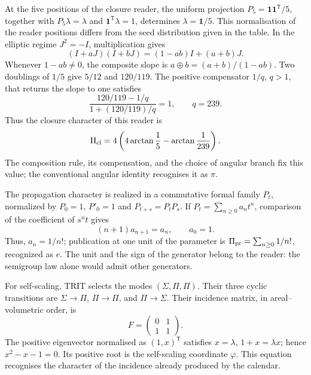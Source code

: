 At the five positions of the closure reader, the uniform projection
\(P_5=\mathbf1\mathbf1^{\mathsf T}/5\), together with
\(P_5\lambda=\lambda\) and \(\mathbf1^{\mathsf T}\lambda=1\), determines
\(\lambda=\mathbf1/5\). This normalisation of the reader positions
differs from the seed distribution given in the table.
In the elliptic regime \(J^2=-I\), multiplication gives
\[
(I+aJ)(I+bJ)=(1-ab)I+(a+b)J.
\]
Whenever \(1-ab\ne0\), the composite slope is
\(a\oplus b=(a+b)/(1-ab)\). Two doublings of \(1/5\) give
\(5/12\) and \(120/119\). The positive compensator \(1/q\), \(q>1\),
that returns the slope to one satisfies
\[
\frac{120/119-1/q}{1+(120/119)/q}=1,
\qquad q=239.
\]
Thus the closure character of this reader is
\begin{equation}
 \Pi_{\rm cl}=4\left(4\arctan\frac15-\arctan\frac1{239}\right).
 \label{vi:vi:dep:lector-clausura}
\end{equation}
The composition rule, its compensation, and the choice of angular branch
fix this value; the conventional angular identity recognises it as \(\pi\).

The propagation character is realized in a commutative formal family
\(P_t\), normalized by \(P_0=1\), \(P'_0=1\) and
\(P_{t+s}=P_tP_s\). If \(P_t=\sum_{n\ge0}a_nt^n\), comparison
of the coefficient of \(s^nt\) gives
\[
 (n+1)a_{n+1}=a_n,\qquad a_0=1.
\]
Thus, \(a_n=1/n!\); publication at one unit of the parameter is
\(\Pi_{\rm pr}=\sum_{n\ge0}1/n!\), recognized as \(e\).
The unit and the sign of the generator belong to the reader: the semigroup law
alone would admit other generators.

For self-scaling, TRIT selects the modes
\((\Sigma,\Pi,\Pi)\). Their three cyclic transitions are
\(\Sigma\to\Pi\), \(\Pi\to\Pi\), and \(\Pi\to\Sigma\). Their incidence
matrix, in areal--volumetric order, is
\begin{equation}
 F=\begin{pmatrix}0&1\\1&1\end{pmatrix}.
 \label{vi:vi:dep:incidencia-hojas}
\end{equation}
The positive eigenvector normalised as \((1,x)^{\mathsf T}\)
satisfies \(x=\lambda\), \(1+x=\lambda x\); hence
\(x^2-x-1=0\). Its positive root is the self-scaling coordinate
\(\varphi\). This equation recognises the character of the incidence already
produced by the calendar.


